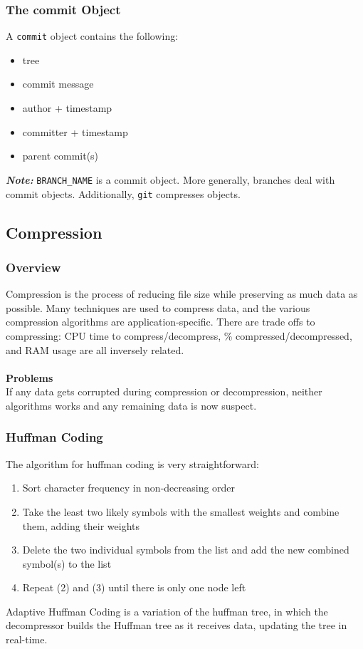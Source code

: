 \documentclass[13pt]{article}
\begin{document}
\subsubsection{The commit Object}
A \texttt{commit} object contains the following:
\begin{itemize}[label=]
\item tree
\item commit message
\item author + timestamp
\item committer + timestamp
\item parent commit(s)
\end{itemize}
\textit{\textbf{Note:}} \texttt{BRANCH\_NAME} is a commit object. More generally, branches deal with commit objects. Additionally, \texttt{git} compresses objects.





\subsection{Compression}

\subsubsection{Overview}
Compression is the process of reducing file size while preserving as much data as possible. Many techniques are used to compress data, and the various compression algorithms are application-specific. There are trade offs to compressing: CPU time to compress/decompress, \% compressed/decompressed, and RAM usage are all inversely related. \\ \\
\textbf{Problems} \\
If any data gets corrupted during compression or decompression, neither algorithms works and any remaining data is now suspect.

\subsubsection{Huffman Coding}
The algorithm for huffman coding is very straightforward:
\begin{enumerate}[label=(\arabic*)]
\item Sort character frequency in non-decreasing order
\item Take the least two likely symbols with the smallest weights and combine them, adding their weights
\item Delete the two individual symbols from the list and add the new combined symbol(s) to the list
\item Repeat (2) and (3) until there is only one node left
\end{enumerate}
Adaptive Huffman Coding is a variation of the huffman tree, in which the decompressor builds the Huffman tree as it receives data, updating the tree in real-time.
\end{document}
